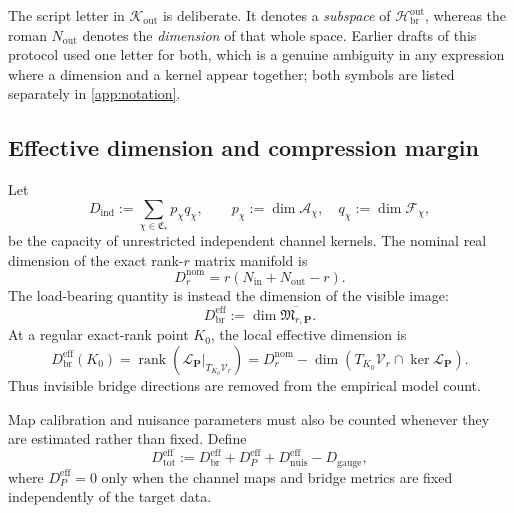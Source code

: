 \documentclass[11pt]{article}
\newcommand{\Kout}{\mathcal{K}_{\mathrm{out}}}
\begin{document}
The script letter in \(\Kout\) is deliberate. It denotes a \emph{subspace} of \(\mathcal H_{\mathrm{br}}^{\mathrm{out}}\), whereas the roman \(N_{\mathrm{out}}\) denotes the \emph{dimension} of that whole space. Earlier drafts of this protocol used one letter for both, which is a genuine ambiguity in any expression where a dimension and a kernel appear together; both symbols are listed separately in \cref{app:notation}.

\subsection{Effective dimension and compression margin}

Let
\begin{equation}
D_{\mathrm{ind}}
:=\sum_{\chi\in\mathfrak C_*}p_{\chi}q_{\chi},
\qquad
p_{\chi}:=\dim\mathcal A_{\chi},
\quad
q_{\chi}:=\dim\mathcal F_{\chi},
\label{eq:independent_capacity}
\end{equation}
be the capacity of unrestricted independent channel kernels. The nominal real dimension of the exact rank-\(r\) matrix manifold is
\begin{equation}
D_r^{\mathrm{nom}}
=r(N_{\mathrm{in}}+N_{\mathrm{out}}-r).
\label{eq:nominal_rank_dimension}
\end{equation}
The load-bearing quantity is instead the dimension of the visible image:
\begin{equation}
\boxed{
D_{\mathrm{br}}^{\mathrm{eff}}
:=\dim\overline{\mathfrak M_{r,\mathbf P}}.
}
\label{eq:effective_bridge_dimension}
\end{equation}
At a regular exact-rank point \(K_0\), the local effective dimension is
\begin{equation}
D_{\mathrm{br}}^{\mathrm{eff}}(K_0)
=
\operatorname{rank}
\left(
\mathcal L_{\mathbf P}\big|_{T_{K_0}\mathcal V_r}
\right)
=D_r^{\mathrm{nom}}
-
\dim\!
\left(
T_{K_0}\mathcal V_r\cap\ker\mathcal L_{\mathbf P}
\right).
\label{eq:local_effective_dimension}
\end{equation}
Thus invisible bridge directions are removed from the empirical model count.

Map calibration and nuisance parameters must also be counted whenever they are estimated rather than fixed. Define
\begin{equation}
D_{\mathrm{tot}}^{\mathrm{eff}}
:=
D_{\mathrm{br}}^{\mathrm{eff}}
+D_{P}^{\mathrm{eff}}
+D_{\mathrm{nuis}}^{\mathrm{eff}}
-D_{\mathrm{gauge}},
\label{eq:total_effective_capacity}
\end{equation}
where \(D_{P}^{\mathrm{eff}}=0\) only when the channel maps and bridge metrics are fixed independently of the target data.
\end{document}
